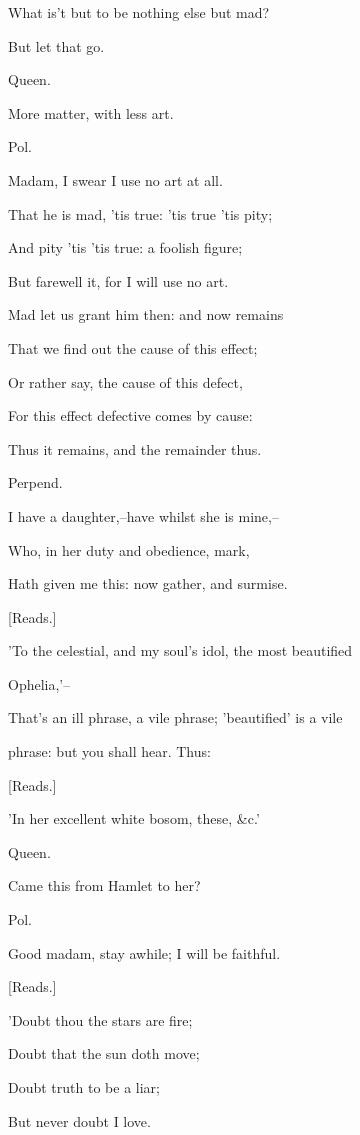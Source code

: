 \documentclass[12pt]{book}
\begin{document}
What is't but to be nothing else but mad?

But let that go.



Queen.

More matter, with less art.



Pol.

Madam, I swear I use no art at all.

That he is mad, 'tis true: 'tis true 'tis pity;

And pity 'tis 'tis true: a foolish figure;

But farewell it, for I will use no art.

Mad let us grant him then: and now remains

That we find out the cause of this effect;

Or rather say, the cause of this defect,

For this effect defective comes by cause:

Thus it remains, and the remainder thus.

Perpend.

I have a daughter,--have whilst she is mine,--

Who, in her duty and obedience, mark,

Hath given me this: now gather, and surmise.

[Reads.]

'To the celestial, and my soul's idol, the most beautified

Ophelia,'--

That's an ill phrase, a vile phrase; 'beautified' is a vile

phrase: but you shall hear. Thus:

[Reads.]

'In her excellent white bosom, these, \&c.'



Queen.

Came this from Hamlet to her?



Pol.

Good madam, stay awhile; I will be faithful.

[Reads.]

  'Doubt thou the stars are fire;

     Doubt that the sun doth move;

   Doubt truth to be a liar;

     But never doubt I love.
\end{document}
